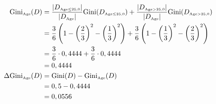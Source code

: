 \documentclass[
english,
smallborders
]{i6prcsht}
\newcommand{\OfSpecificValue}[3]{_{\text{\tiny #1#2#3}}}
\newcommand{\OfAttribute}[1]{_{\text{\tiny #1}}}
\begin{document}
\begin{solution}
\begin{enumerate}
\begin{enumerate}
\begin{enumerate}
\begin{enumerate}
					                        \begin{alignat*}{2}
						                        \text{Gini}\OfAttribute{Age}(D)       & = \frac{|D\OfSpecificValue{Age}{$\leq$}{25,0}|}{|D\OfAttribute{Age}|} \text{Gini}(D\OfSpecificValue{Age}{$\leq$}{25,0}) + \frac{|D\OfSpecificValue{Age}{$>$}{25,0}|}{|D\OfAttribute{Age}|} \text{Gini}(D\OfSpecificValue{Age}{$>$}{25,0}) \\
						                                                              & = \frac{3}{6} \left(1 - \left(\frac{2}{3}\right)^2 - \left(\frac{1}{3}\right)^2\right) + \frac{3}{6} \left(1 - \left(\frac{1}{3}\right)^2 - \left(\frac{2}{3}\right)^2\right)                                                             \\
						                                                              & = \frac{3}{6} \cdot 0,4444 + \frac{3}{6} \cdot 0,4444                                                                                                                                                                                     \\
						                                                              & = 0,4444                                                                                                                                                                                                                                  \\
						                        \Delta\text{Gini}\OfAttribute{Age}(D) & = \text{Gini}(D) - \text{Gini}\OfAttribute{Age}(D)                                                                                                                                                                                        \\
						                                                              & = 0,5 - 0,4444                                                                                                                                                                                                                            \\
						                                                              & = 0,0556                                                                                                                                                                                                                                  \\
					                        \end{alignat*}
				                  \end{enumerate}


\end{enumerate}
\end{enumerate}
\end{enumerate}
\end{solution}
\end{document}
